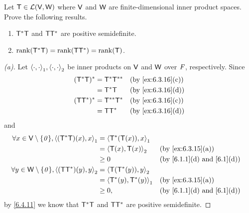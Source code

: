 \begin{ex}\label{ex:6.4.18}
  Let \(\mathsf{T} \in \mathcal{L}(\mathsf{V}, \mathsf{W})\) where \(\mathsf{V}\) and \(\mathsf{W}\) are finite-dimensional inner product spaces.
  Prove the following results.
  \begin{enumerate}
    \item \(\mathsf{T}^* \mathsf{T}\) and \(\mathsf{T} \mathsf{T}^*\) are positive semidefinite.
    \item \(\rk{\T^* \T} = \rk{\T \T^*} = \rk{\T}\).
  \end{enumerate}
\end{ex}

\begin{proof}[(a)]
  Let \(\inn{\cdot, \cdot}_1, \inn{\cdot, \cdot}_2\) be inner products on \(\mathsf{V}\) and \(\mathsf{W}\) over \(\mathit{F}\), respectively.
  Since
  \begin{align*}
    (\T^* \T)^* & = \T^* \T^{**} &  & \by{ex:6.3.16}[c] \\
                & = \T^* \T      &  & \by{ex:6.3.16}[d] \\
    (\T \T^*)^* & = \T^{**} \T^* &  & \by{ex:6.3.16}[c] \\
                & = \T \T^*      &  & \by{ex:6.3.16}[d]
  \end{align*}
  and
  \begin{align*}
    \forall x \in \V \setminus \set{\zv}, \inn{(\T^* \T)(x), x}_1 & = \inn{\T^*(\T(x)), x}_1                                                      \\
                                                                  & = \inn{\T(x), \T(x)}_2     &  & \by{ex:6.3.15}[a]                             \\
                                                                  & \geq 0                     &  & \text{(by \cref{6.1.1}(d) and \cref{6.1}(d))} \\
    \forall y \in \W \setminus \set{\zv}, \inn{(\T \T^*)(y), y}_2 & = \inn{\T(\T^*(y)), y}_2                                                      \\
                                                                  & = \inn{\T^*(y), \T^*(y)}_1 &  & \by{ex:6.3.15}[a]                             \\
                                                                  & \geq 0,                    &  & \text{(by \cref{6.1.1}(d) and \cref{6.1}(d))}
  \end{align*}
  by \cref{6.4.11} we know that \(\mathsf{T}^* \mathsf{T}\) and \(\mathsf{T} \mathsf{T}^*\) are positive semidefinite.
\end{proof}

